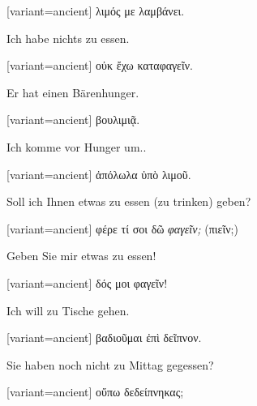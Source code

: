 \begin{greek}[variant=ancient]%
λιμός με λαμβάνει.

\end{greek}%
\switchcolumn*

Ich habe nichts zu essen.

\switchcolumn

\begin{greek}[variant=ancient]%
οὐκ ἔχω καταφαγεῖν.

\end{greek}%
\switchcolumn*

Er hat einen Bärenhunger.

\switchcolumn

\begin{greek}[variant=ancient]%
βουλιμιᾷ.

\end{greek}%
\switchcolumn*

Ich komme vor Hunger um..

\switchcolumn

\begin{greek}[variant=ancient]%
ἀπόλωλα ὑπὸ λιμοῦ.

\end{greek}%
\switchcolumn*

Soll ich Ihnen etwas zu essen (zu trinken) geben?

\switchcolumn

\begin{greek}[variant=ancient]%
φέρε τί σοι δῶ \emph{φαγεῖν;} (πιεῖν;)

\end{greek}%
\switchcolumn*

Geben Sie mir etwas zu essen!

\switchcolumn

\begin{greek}[variant=ancient]%
δός μοι φαγεῖν!

\end{greek}%
\switchcolumn*

Ich will zu Tische gehen.

\switchcolumn

\begin{greek}[variant=ancient]%
βαδιοῦμαι ἐπὶ δεῖπνον.

\end{greek}%
\switchcolumn*

Sie haben noch nicht zu Mittag gegessen?

\switchcolumn

\begin{greek}[variant=ancient]%
οὔπω δεδείπνηκας;

\end{greek}%
\switchcolumn*

